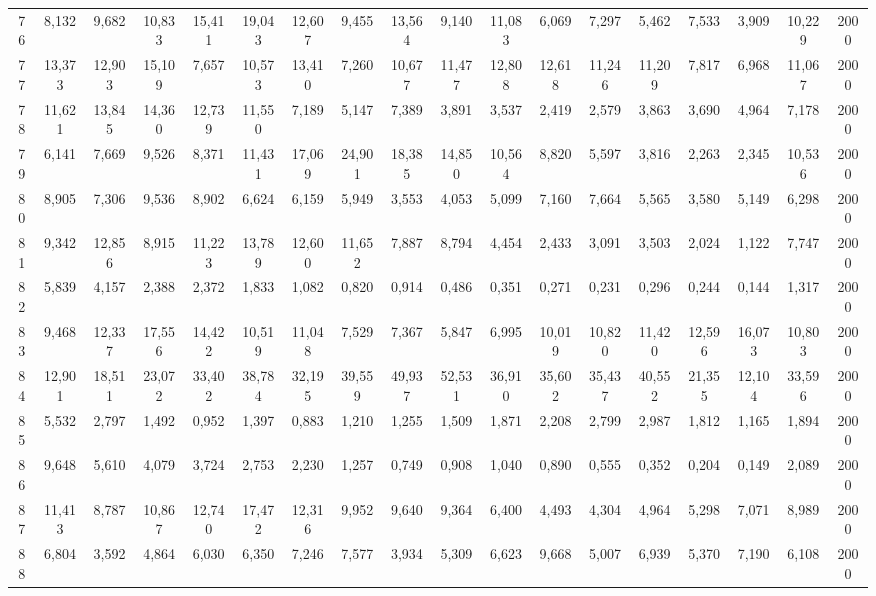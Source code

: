 {\begin{longtable}{ >{\tiny}cccccccccccccccccc}
76  & 8,132  & 9,682  & 10,833 & 15,411 & 19,043 & 12,607 & 9,455  & 13,564 & 9,140  & 11,083 & 6,069  & 7,297  & 5,462   & 7,533   & 3,909   & 10,229 & 2000 \\
77  & 13,373 & 12,903 & 15,109 & 7,657  & 10,573 & 13,410 & 7,260  & 10,677 & 11,477 & 12,808 & 12,618 & 11,246 & 11,209  & 7,817   & 6,968   & 11,067 & 2000 \\
78  & 11,621 & 13,845 & 14,360 & 12,739 & 11,550 & 7,189  & 5,147  & 7,389  & 3,891  & 3,537  & 2,419  & 2,579  & 3,863   & 3,690   & 4,964   & 7,178  & 2000 \\
79  & 6,141  & 7,669  & 9,526  & 8,371  & 11,431 & 17,069 & 24,901 & 18,385 & 14,850 & 10,564 & 8,820  & 5,597  & 3,816   & 2,263   & 2,345   & 10,536 & 2000 \\
80  & 8,905  & 7,306  & 9,536  & 8,902  & 6,624  & 6,159  & 5,949  & 3,553  & 4,053  & 5,099  & 7,160  & 7,664  & 5,565   & 3,580   & 5,149   & 6,298  & 2000 \\
81  & 9,342  & 12,856 & 8,915  & 11,223 & 13,789 & 12,600 & 11,652 & 7,887  & 8,794  & 4,454  & 2,433  & 3,091  & 3,503   & 2,024   & 1,122   & 7,747  & 2000 \\
82  & 5,839  & 4,157  & 2,388  & 2,372  & 1,833  & 1,082  & 0,820  & 0,914  & 0,486  & 0,351  & 0,271  & 0,231  & 0,296   & 0,244   & 0,144   & 1,317  & 2000 \\
83  & 9,468  & 12,337 & 17,556 & 14,422 & 10,519 & 11,048 & 7,529  & 7,367  & 5,847  & 6,995  & 10,019 & 10,820 & 11,420  & 12,596  & 16,073  & 10,803 & 2000 \\
84  & 12,901 & 18,511 & 23,072 & 33,402 & 38,784 & 32,195 & 39,559 & 49,937 & 52,531 & 36,910 & 35,602 & 35,437 & 40,552  & 21,355  & 12,104  & 33,596 & 2000 \\
85  & 5,532  & 2,797  & 1,492  & 0,952  & 1,397  & 0,883  & 1,210  & 1,255  & 1,509  & 1,871  & 2,208  & 2,799  & 2,987   & 1,812   & 1,165   & 1,894  & 2000 \\
86  & 9,648  & 5,610  & 4,079  & 3,724  & 2,753  & 2,230  & 1,257  & 0,749  & 0,908  & 1,040  & 0,890  & 0,555  & 0,352   & 0,204   & 0,149   & 2,089  & 2000 \\
87  & 11,413 & 8,787  & 10,867 & 12,740 & 17,472 & 12,316 & 9,952  & 9,640  & 9,364  & 6,400  & 4,493  & 4,304  & 4,964   & 5,298   & 7,071   & 8,989  & 2000 \\
88  & 6,804  & 3,592  & 4,864  & 6,030  & 6,350  & 7,246  & 7,577  & 3,934  & 5,309  & 6,623  & 9,668  & 5,007  & 6,939   & 5,370   & 7,190   & 6,108  & 2000 \\

\end{longtable}}
